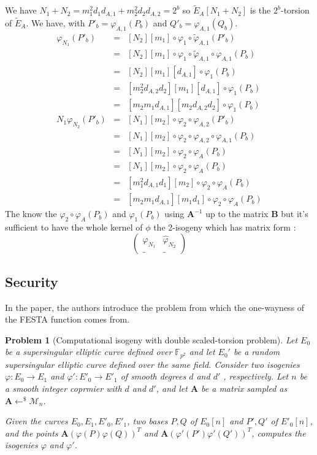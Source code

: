\documentclass[12pt,a4paper]{article}
\newtheorem{problem}{Problem}
\begin{document}
		We have $N_1 + N_2 = m_1^2d_1d_{A,1} + m_2^2d_2d_{A,2}=2^b$ so $\tilde{E}_A[N_1+N_2]$ is
		the $2^b$-torsion of $\tilde E_A$. We have, with $P'_b=\varphi_{A,1}(P_b)$ and 
		$Q'_b=\varphi_{A,1}(Q_b)$.
		\begin{eqnarray*}
			[N_2]\varphi_{N_1}(P'_b) & = & [N_2][m_1]\circ\varphi_1\circ\tilde\varphi_{A,1}(P'_b) \\
															 & = & [N_2][m_1]\circ\varphi_1\circ\tilde\varphi_{A,1}
															 \circ\varphi_{A,1}(P_b) \\
															 & = & [N_2][m_1][d_{A,1}]\circ\varphi_1(P_b) \\
															 & = & [m_2^2d_{A,2}d_2][m_1][d_{A,1}]\circ\varphi_1(P_b) \\
															 & = & [m_2m_1d_{A,1}][m_2d_{A,2}d_2]\circ\varphi_1(P_b) \\
			N_1\varphi_{N_2}(P'_b) & = & [N_1][m_2]\circ\varphi_2\circ\varphi_{A,2}(P'_b) \\
														 & = & [N_1][m_2]\circ\varphi_2\circ\varphi_{A,2}\circ\varphi_{A,1}(P_b) \\
														 & = & [N_1][m_2]\circ\varphi_2\circ\varphi_A(P_b) \\
														 & = & [N_1][m_2]\circ\varphi_2\circ\varphi_A(P_b) \\
														 & = & [m_1^2d_{A,1}d_1][m_2]\circ\varphi_2\circ\varphi_A(P_b) \\
														 & = & [m_2m_1d_{A,1}][m_1d_1]\circ\varphi_2\circ\varphi_A(P_b) 
		\end{eqnarray*}
		The know the $\varphi_2\circ\varphi_A(P_b)$ and $\varphi_1(P_b)$ using $\mathbf A^{-1}$
		up to the matrix $\mathbf B$ but
		it's sufficient to have the whole kernel of $\phi$ the 2-isogeny which has matrix form :
		$$\begin{pmatrix}
			\varphi_{N_1} & \widehat\varphi_{N_2} \\
		\_ & \_ \end{pmatrix}
		$$

		\subsection{Security}
		In the paper, the authors introduce the problem from which the one-wayness of the
		FESTA function comes from.
		\begin{problem}[Computational isogeny with double scaled-torsion problem]
			Let $E_0$ be a supersingular elliptic curve defined over $\mathbb{F}_{p^2}$ and
			let  $E_0'$ be a random supersingular elliptic curve defined over the same field.
			Consider two isogenies $\varphi:E_0\to E_1$ and $\varphi':E'_0\to E'_1$ of smooth
			degrees $d$ and $d'$ , respectively. Let $n$ be a smooth integer coprmier with $d$ and 
			$d'$, and let $\mathbf A $ be a matrix sampled as $\mathbf A\gets^{\$}\mathcal M_n$.

			Given the curves  $E_0,E_1,E'_0,E'_1$, two bases $P,Q$ of $E_0[n]$ and $P',Q'$ of
			$E'_0[n]$, and the points $\mathbf A(\varphi(P)\varphi(Q))^T$ and $\mathbf A
			(\varphi'(P')\varphi'(Q'))^T$, computes the isogenies $\varphi$ and $\varphi'$.
		\end{problem}
\end{document}
